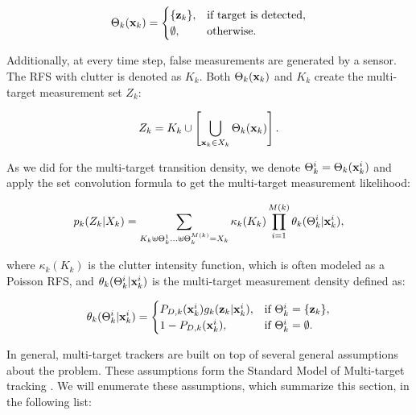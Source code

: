 \begin{equation}
    \Theta_k(\vecat{x}{k}) = \begin{cases}
        \{\vecat{z}{k}\}, & \text{if target is detected}, \\
        \emptyset, & \text{otherwise}.
    \end{cases}
\end{equation}

Additionally, at every time step, false measurements are generated by a sensor. The RFS with clutter is denoted as $K_k$. Both $\Theta_k(\vecat{x}{k})$ and $K_k$ create the multi-target measurement set $Z_k$:

\begin{equation}
    Z_k = K_k \cup \left[ \bigcup_{\vecat{x}{k} \in X_k} \Theta_k(\vecat{x}{k}) \right].
\end{equation}

As we did for the multi-target transition density, we denote $\Theta_k^i = \Theta_k(\svecat{x}{k}{i})$ and apply the set convolution formula to get the multi-target measurement likelihood:

\begin{equation}
    p_k(Z_k | X_k) = \sum_{
        K_k \uplus \Theta_{k}^1 \ldots \uplus \Theta_{k}^{M(k)} = X_{k}
    }
    \kappa_k(K_k)
    \prod_{i=1}^{M(k)}
    \theta_{k}(\Theta_{k}^i | \svecat{x}{k}{i}),
\end{equation}

\noindent where $\kappa_k(K_k)$ is the clutter intensity function, which is often modeled as a Poisson RFS, and $\theta_{k}(\Theta_{k}^i | \svecat{x}{k}{i})$ is the multi-target measurement density defined as:

\begin{equation}
    \theta_k(\Theta_{k}^i | \svecat{x}{k}{i}) = \begin{cases}
        P_{D,k}(\svecat{x}{k}{i})
            g_k(\vecat{z}{k} | \svecat{x}{k}{i}), & \text{if } \Theta_{k}^i = \{\vecat{z}{k}\}, \\
            1 - P_{D,k}(\svecat{x}{k}{i}), & \text{if } \Theta_{k}^i = \emptyset.
    \end{cases}
\end{equation}

In general, multi-target trackers are built on top of several general assumptions about the problem. These assumptions form the Standard Model of Multi-target tracking \cite[311--313]{mahlerStatisticalMultisourcemultitargetInformation2007}. We will enumerate these assumptions, which summarize this section, in the following list:

